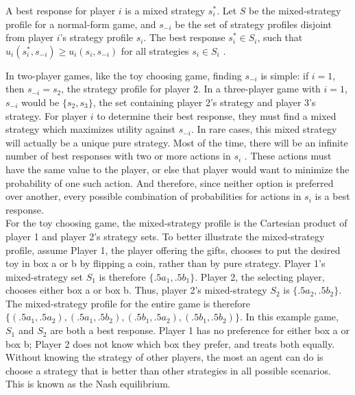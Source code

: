 \begin{define}
  A best response for player $i$ is a mixed strategy $s_i^*$. Let $S$ be the mixed-strategy profile for a normal-form game, and $s_{-i}$ be the set of strategy profiles disjoint from player $i$'s strategy profile $s_i$. The best response $s_i^*\in S_i$, such that $u_i(s_i^*,s_{-i}) \ge u_i(s_i, s_{-i})$ for all strategies $s_i\in S_i$ \cite{shoh09}.
\end{define}

In two-player games, like the toy choosing game, finding $s_{-i}$ is simple: if $i=1$, then $s_{-i}=s_2$, the strategy profile for player 2. In a three-player game with $i=1$, $s_{-i}$ would be $\{s_2, s_3\}$, the set containing player 2's strategy and player 3's strategy. For player $i$ to determine their best response, they must find a mixed strategy which maximizes utility against $s_{-i}$. In rare cases, this mixed strategy will actually be a unique pure strategy. Most of the time, there will be an infinite number of best responses with two or more actions in $s_i$ \cite{shoh09}. These actions must have the same value to the player, or else that player would want to minimize the probability of one such action. And therefore, since neither option is preferred over another, every possible combination of probabilities for actions in $s_i$ is a best response.\\

For the toy choosing game, the mixed-strategy profile is the Cartesian product of player 1 and player 2's strategy sets. To better illustrate the mixed-strategy profile, assume Player 1, the player offering the gifts, chooses to put the desired toy in box a or b by flipping a coin, rather than by pure strategy. Player 1's mixed-strategy set $S_1$ is therefore $\{.5a_1, .5b_1\}$. Player 2, the selecting player, chooses either box a or box b. Thus, player 2's mixed-strategy $S_2$ is $\{.5a_2, .5b_2\}$. The mixed-strategy profile for the entire game is therefore $\{(.5a_1, .5a_2), (.5a_1, .5b_2), (.5b_1, .5a_2), (.5b_1, .5b_2)\}$. In this example game, $S_1$ and $S_2$ are both a best response. Player 1 has no preference for either box a or box b; Player 2 does not know which box they prefer, and treats both equally.\\

Without knowing the strategy of other players, the most an agent can do is choose a strategy that is better than other strategies in all possible scenarios. This is known as the Nash equilibrium.

